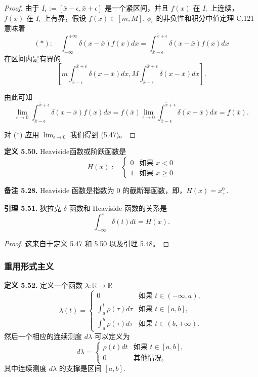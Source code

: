 \documentclass[a4paper]{ctexart}
\begin{document}
{\begin{proof}
由于 $I_{\epsilon} := [\bar{x}-\epsilon, \bar{x}+\epsilon]$ 是一个紧区间，并且 $f(x)$ 在 $I_{\epsilon}$ 上连续，
$f(x)$ 在 $I_{\epsilon}$ 上有界，假设 $f(x) \in [m, M]$. 
$\phi_{\epsilon}$ 的非负性和积分中值定理 C.121 意味着
\[ 
(*): \quad \int_{-\infty}^{+\infty} \delta(x-\bar{x}) f(x) dx = \int_{\bar{x}-\epsilon}^{\bar{x}+\epsilon} \delta(x-\bar{x}) f(x) dx 
\]
在区间内是有界的
\[ 
  \left[ m \int_{\bar{x}-\epsilon}^{\bar{x}+\epsilon} \delta(x-\bar{x}) dx, M \int_{\bar{x}-\epsilon}^{\bar{x}+\epsilon} \delta(x-\bar{x}) dx \right]. 
\]
  
由此可知
\[ 
  \lim_{\epsilon \to 0} \int_{\bar{x}-\epsilon}^{\bar{x}+\epsilon} \delta(x-\bar{x}) f(x) dx 
  = f(\bar{x}) \lim_{\epsilon \to 0} \int_{\bar{x}-\epsilon}^{\bar{x}+\epsilon} \delta(x-\bar{x}) dx = f(\bar{x}). 
\]
  
对 (*) 应用 $\lim_{\epsilon \to 0}$ 我们得到 (5.47)。
\end{proof}

\noindent \textbf{定义 5.50.} Heaviside函数或阶跃函数是
\[ 
  H(x) := \begin{cases} 0 & \text{如果 } x < 0 \\ 1 & \text{如果 } x \geq 0 \end{cases} 
\]

\noindent \textbf{备注 5.28.} Heaviside 函数是指数为 $0$ 的截断幂函数，即，$H(x) = x_{+}^{0}$.

\noindent \textbf{引理 5.51.} 狄拉克 $\delta$ 函数和 Heaviside 函数的关系是
\[ 
  \int_{-\infty}^{x} \delta(t) dt = H(x). \tag{5.49}
\]
\begin{proof}
这来自于定义 5.47 和 5.50 以及引理 5.48。
\end{proof}

\subsubsection{重用形式主义}

\noindent \textbf{定义 5.52.} 定义一个函数 $\lambda: \mathbb{R} \rightarrow \mathbb{R}$
\[ \lambda(t) = \begin{cases} 
    0 & \text{如果 } t \in (-\infty, a), \\
    \int_a^t \rho(\tau) d\tau & \text{如果 } t \in [a, b], \\
    \int_a^b \rho(\tau) d\tau & \text{如果 } t \in (b, +\infty).
  \end{cases} 
\]
然后一个相应的连续测度 $d\lambda$ 可以定义为
\[ 
  d\lambda = \begin{cases} 
    \rho(t) dt & \text{如果 } t \in [a, b], \\
    0 & \text{其他情况,}
  \end{cases} \tag{5.51} 
\]
其中连续测度 $d\lambda$ 的支撑是区间 $[a, b]$.

}
\end{document}
